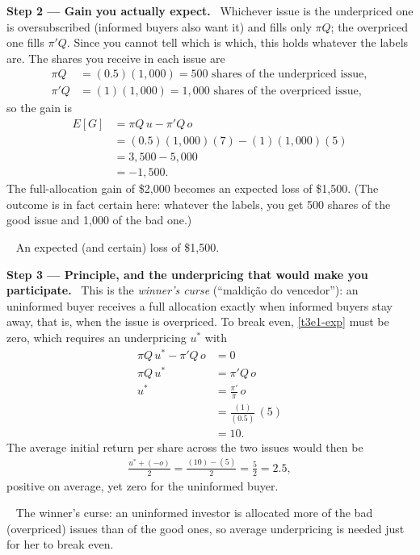\documentclass[11pt,a4paper]{article}
\newcommand{\step}[2]{\par\medskip\noindent\textbf{Step #1 --- #2.}~}
\newcommand{\pt}{\foreignlanguage{brazilian}}
\newcommand{\answer}[1]{\par\smallskip\noindent\fbox{\textbf{Answer #1.}}~}
\begin{document}
\step{2}{Gain you actually expect} Whichever issue is the underpriced one is oversubscribed (informed buyers also want it) and fills only $\pi Q$; the overpriced one fills $\pi' Q$. Since you cannot tell which is which, this holds whatever the labels are. The shares you receive in each issue are
\begin{align}
  \pi Q &= (0.5)(1{,}000) = 500 \text{ shares of the underpriced issue}, \nonumber\\
  \pi' Q &= (1)(1{,}000) = 1{,}000 \text{ shares of the overpriced issue}, \nonumber
\end{align}
so the gain is
\begin{align}
  E[G] &= \pi Q\,u - \pi' Q\,o \label{t3e1-exp}\\
       &= (0.5)(1{,}000)(7)-(1)(1{,}000)(5) \nonumber\\
       &= 3{,}500-5{,}000 \nonumber\\
       &= -1{,}500. \nonumber
\end{align}
The full-allocation gain of \$2{,}000 becomes an expected loss of \$1{,}500. (The outcome is in fact certain here: whatever the labels, you get 500 shares of the good issue and 1{,}000 of the bad one.)

\answer{(b)} An expected (and certain) loss of \$1{,}500.

\step{3}{Principle, and the underpricing that would make you participate} This is the \emph{winner's curse} (\pt{``maldi\c{c}\~ao do vencedor''}): an uninformed buyer receives a full allocation exactly when informed buyers stay away, that is, when the issue is overpriced. To break even, \eqref{t3e1-exp} must be zero, which requires an underpricing $u^{*}$ with
\begin{align}
  \pi Q\,u^{*} - \pi' Q\,o &= 0 \nonumber\\
  \pi Q\,u^{*} &= \pi' Q\,o \nonumber\\
  u^{*} &= \frac{\pi'}{\pi}\,o \label{t3e1-ustar}\\
        &= \frac{(1)}{(0.5)}\,(5) \nonumber\\
        &= 10. \nonumber
\end{align}
The average initial return per share across the two issues would then be
\begin{align}
  \frac{u^{*}+(-o)}{2} = \frac{(10)-(5)}{2} = \frac{5}{2} = 2.5, \nonumber
\end{align}
positive on average, yet zero for the uninformed buyer.

\answer{(c)} The winner's curse: an uninformed investor is allocated more of the bad (overpriced) issues than of the good ones, so average underpricing is needed just for her to break even.
\end{document}
